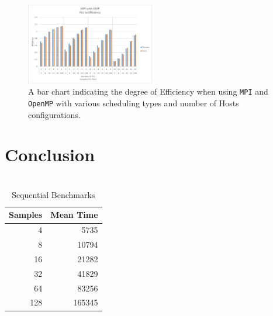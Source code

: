 \documentclass[journal,transmag]{IEEEtran}
\begin{document}
		\begin{figure}[h]
			\centering
			\includegraphics[width = 0.5\textwidth]{chartOMPIEff}
			\caption{A bar chart indicating the degree of Efficiency when using \texttt{MPI} and \texttt{OpenMP} with various scheduling types and number of Hosts configurations.}
			\label{fig_ompi_eff}
		\end{figure}
		\newpage
	
\section{Conclusion}
		




\newpage
\onecolumn
\appendices
\section{}
	\begin{table}[h]
		\centering
		\caption{Sequential Benchmarks}
		\label{table_seq_data}
		\begin{tabular}{|r|r|}
			\hline
			\multicolumn{1}{|l|}{Samples} & \multicolumn{1}{l|}{Mean Time} \\ \hline
			4                             & 5735                           \\ \hline
			8                             & 10794                          \\ \hline
			16                            & 21282                          \\ \hline
			32                            & 41829                          \\ \hline
			64                            & 83256                          \\ \hline
			128                           & 165345                         \\ \hline
		\end{tabular}
	\end{table}
\end{document}
